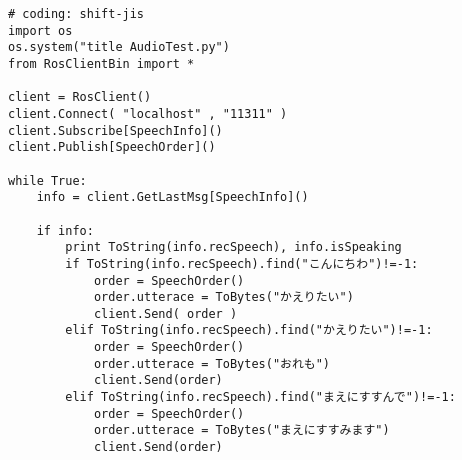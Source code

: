 \documentclass[10pt,a4j]{jsarticle}
\begin{document}
\begin{lstlisting}[caption=AudioTest.py, label=p4_txt]
# coding: shift-jis
import os
os.system("title AudioTest.py")
from RosClientBin import *

client = RosClient()
client.Connect( "localhost" , "11311" )
client.Subscribe[SpeechInfo]()
client.Publish[SpeechOrder]()

while True:
    info = client.GetLastMsg[SpeechInfo]()

    if info:
        print ToString(info.recSpeech), info.isSpeaking
        if ToString(info.recSpeech).find("こんにちわ")!=-1:
            order = SpeechOrder()
            order.utterace = ToBytes("かえりたい")
            client.Send( order )
        elif ToString(info.recSpeech).find("かえりたい")!=-1:
            order = SpeechOrder()
            order.utterace = ToBytes("おれも")
            client.Send(order)
        elif ToString(info.recSpeech).find("まえにすすんで")!=-1:
            order = SpeechOrder()
            order.utterace = ToBytes("まえにすすみます")
            client.Send(order)
\end{lstlisting}
\end{document}
